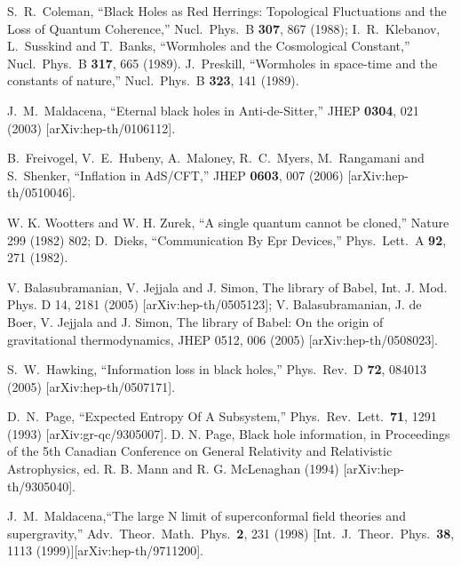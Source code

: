 \documentclass[12pt,onecolumn,eqsecnum,aps,prd,nofootinbib]{revtex4}
\begin{document}
\begin{thebibliography}{99}
 S.~R.~Coleman,
  ``Black Holes as Red Herrings: Topological Fluctuations and the Loss of
  Quantum Coherence,''
  Nucl.\ Phys.\  B {\bf 307}, 867 (1988);
  I.~R.~Klebanov, L.~Susskind and T.~Banks,
  ``Wormholes and the Cosmological Constant,''
  Nucl.\ Phys.\  B {\bf 317}, 665 (1989).
    J.~Preskill,
  ``Wormholes in space-time and the constants of nature,''
  Nucl.\ Phys.\  B {\bf 323}, 141 (1989).


  J.~M.~Maldacena,
  ``Eternal black holes in Anti-de-Sitter,''
  JHEP {\bf 0304}, 021 (2003)
  [arXiv:hep-th/0106112].


 B.~Freivogel, V.~E.~Hubeny, A.~Maloney, R.~C.~Myers, M.~Rangamani and S.~Shenker,
  ``Inflation in AdS/CFT,''
  JHEP {\bf 0603}, 007 (2006)
  [arXiv:hep-th/0510046].

 W. K.  Wootters and W. H. Zurek, ``A single quantum cannot be cloned,'' Nature 299 (1982) 802;  D.~Dieks,
  ``Communication By Epr Devices,''
  Phys.\ Lett.\  A {\bf 92}, 271 (1982).

 V. Balasubramanian, V. Jejjala and J. Simon, The library of Babel, Int. J. Mod. Phys. D
14, 2181 (2005) [arXiv:hep-th/0505123]; V. Balasubramanian, J. de
Boer, V. Jejjala and J. Simon, The library of Babel: On the origin
of gravitational thermodynamics, JHEP 0512, 006 (2005)
[arXiv:hep-th/0508023].


S.~W.~Hawking,
  ``Information loss in black holes,''
  Phys.\ Rev.\  D {\bf 72}, 084013 (2005)
  [arXiv:hep-th/0507171].

     D.~N.~Page,
  ``Expected Entropy Of A Subsystem,''
  Phys.\ Rev.\ Lett.\  {\bf 71}, 1291 (1993)
  [arXiv:gr-qc/9305007].
  D. N. Page, Black hole information, in Proceedings of the 5th Canadian Conference on General Relativity and Relativistic Astrophysics, ed. R. B. Mann and R. G. McLenaghan (1994) [arXiv:hep-th/9305040].

 J.~M.~Maldacena,``The large N limit of superconformal field theories
and supergravity,'' Adv.\ Theor.\ Math.\ Phys.\  {\bf 2}, 231 (1998)
[Int.\ J.\ Theor.\ Phys.\  {\bf 38}, 1113
(1999)][arXiv:hep-th/9711200].


\end{thebibliography}
\end{document}
